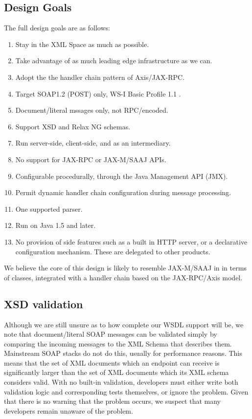 \subsection{Design Goals}
\label{alpine:design}

The full design goals are as follows:

\begin{enumerate}

\item Stay in the XML Space as much as possible.
\item Take advantage of as much leading edge infrastructure as we can.
\item Adopt the the handler chain pattern of Axis/JAX-RPC.
\item Target SOAP1.2 (POST) only, WS-I Basic Profile 1.1 \cite{spec:WSI-11}.
\item Document/literal mssages only, not RPC/encoded.
\item Support XSD and Relax NG schemas.
\item Run server-side, client-side, and as an intermediary. 
\item No support for JAX-RPC or JAX-M/SAAJ APIs.
\item Configurable procedurally, through the Java Management API (JMX).
\item Permit dynamic handler chain configuration during message processing.
\item One supported parser. %
\item Run on Java 1.5 and later.

\item No provision of side features such as a built in HTTP server, or
a declarative configuration mechanism. These are delegated to other products.
\end{enumerate}

We believe the core of this design is likely to resemble JAX-M/SAAJ in
in terms of classes, integrated with a handler chain based on the
JAX-RPC/Axis model.

\subsection{XSD validation}
\label{alpine:validation}

Although we are still unsure as to how complete our WSDL support will be, we
note that document/literal SOAP messages can be validated simply by comparing
the incoming messages to the XML Schema that describes them. Mainstream SOAP
stacks do not do this, usually for performance reasons. This means that the set
of XML documents which an endpoint can receive is significantly larger than the
set of XML documents which its XML schema considers valid. With no built-in
validation, developers must either write both validation logic and corresponding
tests themselves, or ignore the problem. Given that there is no warning that the
problem occurs, we suspect that many developers remain unaware of the problem.

